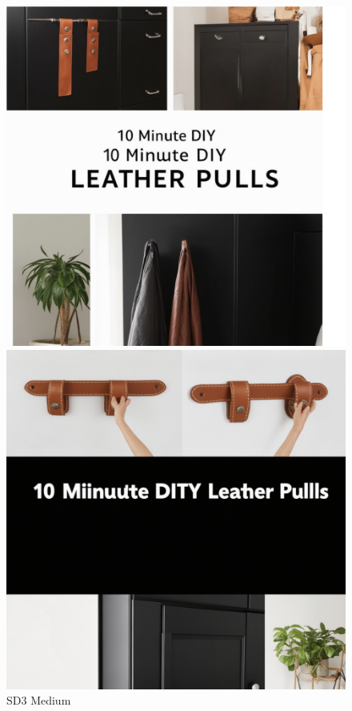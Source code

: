 \documentclass{article}
\begin{document}
\begin{figure}[H]
	\centering
	\begin{minipage}{0.3\textwidth}
		\centering
		\includegraphics[width=\textwidth]{sd3leather.png}
		\caption{SD3 Medium}
		\label{sd3}
	\end{minipage}
	\hfill
	\begin{minipage}{0.3\textwidth}
		\centering
		\includegraphics[width=\textwidth]{sd3.5leather.png}

\end{minipage}
\end{figure}
\end{document}
